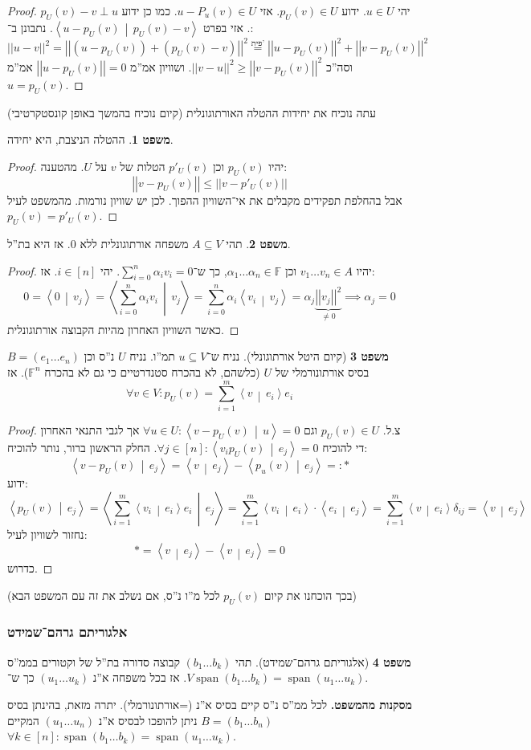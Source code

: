 \documentclass[a4paper]{article}
\newcommand\ra    {\rangle}
\newcommand\la    {\langle}
\newcommand\sumni     {\sum_{i = 0}^{n}}
\DeclareMathOperator{\Sp}      {span}
\newcommand\F         {\mathbb{F}}
\newcommand\co        {\colon}
\newcommand\norm[1]   {\left \vert \left \vert #1 \right \vert \right \vert}
\newcommand\mut [2]   {\left \la #1 \,\middle|\, #2 \right \ra}
\newcommand\ag        {\alpha}
\theoremstyle{definition}
\newtheorem{Theorem}{\color{myblue}משפט}
\newcommand\theo  [1] {\begin{Theorem}#1\end{Theorem}}
\begin{document}
	\begin{proof}
		יהי $u \in U$. ידוע $p_U(v) \in U$. אזי $u - P_u(v) \in U$. כמו כן ידוע $p_U(v) - v \perp u$. אזי בפרט $\mut{u - p_U(v)}{p_U(v) - v}$. נתבונן ב־: 
		\[ \norm{u - v}^2 = \norm{(u - p_U(v)) + (p_U(v) - v)}^2 \overset{\text{פית'}}{=} \norm{u - p_U(v)}^2 + \norm{v - p_U(v)}^2 \]
		וסה''כ $\norm{v - u}^2 \ge \norm{v - p_U(v)}^2$. ושוויון אמ''מ $\norm{u- p_U(v)} = 0$ אמ''מ $u  = p_U(v)$. 
	\end{proof}
	עתה נוכיח את יחידות ההטלה האורתוגונלית (קיום נוכיח בהמשך באופן קונסטקרטיבי)
	\theo{ההטלה הניצבת, היא יחידה. }\begin{proof}
		יהיו $p_U(v)$ וכן $p'_U(v)$ הטלות של $v$ על $U$. מהטענה: 
		\[ \norm{v - p_U(v)} \le \norm{v - p'_U(v)} \]
		אבל בהחלפת תפקידים מקבלים את אי־השוויון ההפוך. לכן יש שוויון נורמות. מהמשפט לעיל $p_U(v) = p'_U(v)$. 
	\end{proof}
	
	\theo{תהי $A \subseteq V$ משפחה אורתוגונלית ללא $0$. אז היא בת''ל. }\begin{proof}
		יהיו $v_1 \dots v_n \in A$ וכן $\ag_1 \dots \ag_n \in \F$, כך ש־$\sumni \ag_i v_i = 0$. יהי $i \in [n]$. אז: 
		\[ 0 = \mut{0}{v_j} = \mut{\sumni \ag_i v_i}{v_j} = \sumni \ag_i \mut{v_i}{v_j} = \ag _j \underbrace{\norm{v_j}^2}_{\neq 0} \implies \ag_j = 0 \]
		כאשר השוויון האחרון מהיות הקבוצה אורתוגונלית. 
	\end{proof}
	
	\begin{Theorem}[קיום היטל אורתוגונלי]
		נניח ש־$u \subseteq V$ תמ''ו. נניח $U$ נ''ס וכן $B = (e_1 \dots e_n)$ בסיס אורתונורמלי של $U$ (כלשהם, לא בהכרח סטנדרטיים כי גם לא בהכרח $\F^n$). אז 
		\[ \forall v \in V \co p_U(v) = \sum_{i = 1}^{m}\mut{v}{e_i}e_i \]
	\end{Theorem}
	\begin{proof}
		צ.ל. $p_U(v) \in U$ וגם $\forall u \in U \co \mut{v - p_U(v)}{u} = 0$ אך לגבי התנאי האחרון די להוכיח $\forall j \in [n] \co \mut{v_i p_U(v)}{e_j}  = 0$. החלק הראשון ברור, נותר להוכיח: 
		\[ \mut{v - p_U(v)}{e_j} = \mut{v}{e_j} - \mut{p_u(v)}{e_j} =: * \]
		ידוע: 
		\[ \mut{p_U(v)}{e_j} = \mut{\sum_{i = 1}^{m}\mut{v_i}{e_i} e_i}{e_j} = \sum_{i = 1}^{m}\mut{v_i}{e_i} \cdot \mut{e_i}{e_j} = \sum_{i = 1}^{m}\mut{v}{e_i}\delta_{ij} = \mut{v}{e_j} \]
		נחזור לשוויון לעיל: 
		\[ *= \mut{v}{e_j} - \mut{v}{e_j} = 0 \]
		כדרוש. 
	\end{proof}
	(בכך הוכחנו את קיום $p_U(v)$ לכל מ''ו נ''ס, אם נשלב את זה עם המשפט הבא)
	
	\subsubsection{אלגוריתם גרהם־שמידט}
	\begin{Theorem}[אלגוריתם גרהם־שמידט]
		תהי $(b_1 \dots b_k)$ קבוצה סדורה בת''ל של וקטורים בממ''ס $V$. אז בכל משפחה א''נ $(u_1 \dots u_k)$ כך ש־$\Sp(b_1 \dots b_k) = \Sp(u_1 \dots u_k)$. 
	\end{Theorem}
	\textbf{מסקנות מהמשפט. }לכל ממ''ס נ''ס קיים בסיס א''נ (=אורתונורמלי). יתרה מזאת, בהינתן בסיס $B = (b_1 \dots b_n)$ ניתן להופכו לבסיס א''נ $(u_1 \dots u_n)$ המקיים $\forall k \in [n] \co \Sp (b_1 \dots b_k) = \Sp(u_1 \dots u_k)$. 
	
\end{document}

